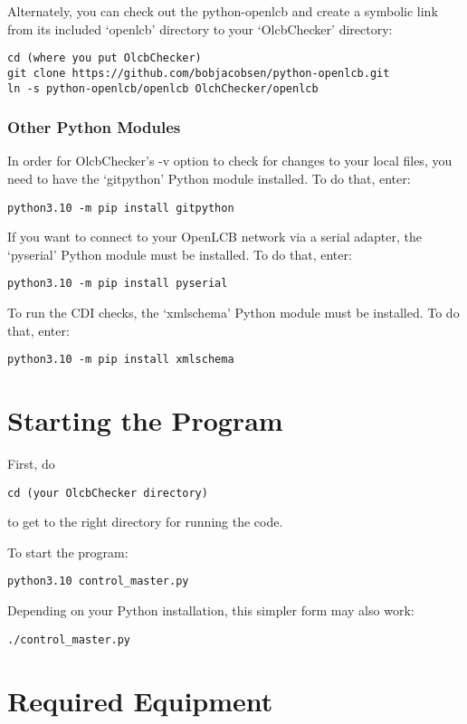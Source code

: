 Alternately, you can check out the python-openlcb 
and create a symbolic link from its included `openlcb' directory to your `OlcbChecker' directory:
\begin{verbatim}
cd (where you put OlcbChecker)
git clone https://github.com/bobjacobsen/python-openlcb.git
ln -s python-openlcb/openlcb OlchChecker/openlcb
\end{verbatim}

\subsubsection{Other Python Modules}
In order for OlcbChecker's -v option to check for changes to your local files, 
you need to have the `gitpython' Python module installed. To do that,
enter:
\begin{verbatim}
python3.10 -m pip install gitpython
\end{verbatim}

If you want to connect to your OpenLCB network via a serial adapter, 
the `pyserial' Python module must be installed. To do that,
enter:
\begin{verbatim}
python3.10 -m pip install pyserial
\end{verbatim}

To run the CDI checks, the `xmlschema' Python module must be installed. To do that,
enter:
\begin{verbatim}
python3.10 -m pip install xmlschema
\end{verbatim}

\section{Starting the Program}

First, do
\begin{verbatim}
cd (your OlcbChecker directory)
\end{verbatim}
to get to the right directory for running the code.

To start the program:
\begin{verbatim}
python3.10 control_master.py
\end{verbatim}

Depending on your Python installation, this simpler form may also work:
\begin{verbatim}
./control_master.py
\end{verbatim}

\section{Required Equipment}

